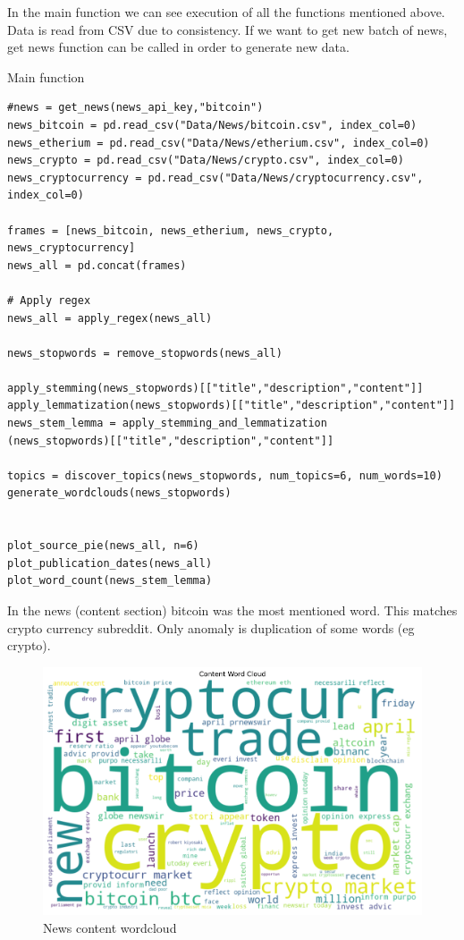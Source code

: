 In the main function we can see execution of all the functions mentioned above. Data is read from CSV due to consistency. If we want to get new batch of news, get news function can be called in order to generate new data.
\begin{listing}[H]
\caption{Main function}
\begin{verbatim}
#news = get_news(news_api_key,"bitcoin")
news_bitcoin = pd.read_csv("Data/News/bitcoin.csv", index_col=0)
news_etherium = pd.read_csv("Data/News/etherium.csv", index_col=0)
news_crypto = pd.read_csv("Data/News/crypto.csv", index_col=0)
news_cryptocurrency = pd.read_csv("Data/News/cryptocurrency.csv", index_col=0)

frames = [news_bitcoin, news_etherium, news_crypto, news_cryptocurrency]
news_all = pd.concat(frames)

# Apply regex
news_all = apply_regex(news_all)

news_stopwords = remove_stopwords(news_all)

apply_stemming(news_stopwords)[["title","description","content"]]
apply_lemmatization(news_stopwords)[["title","description","content"]]
news_stem_lemma = apply_stemming_and_lemmatization
(news_stopwords)[["title","description","content"]]

topics = discover_topics(news_stopwords, num_topics=6, num_words=10)
generate_wordclouds(news_stopwords)


plot_source_pie(news_all, n=6)
plot_publication_dates(news_all)
plot_word_count(news_stem_lemma)
\end{verbatim}
\end{listing}


In the news (content section) bitcoin was the most mentioned word. This matches crypto currency subreddit. Only anomaly is duplication of some words (eg crypto). 
\begin{figure}[H]
\includegraphics[scale=0.60]{img/B2/content_wordcloud.png}
\centering
\caption{News content wordcloud}
\label{fig:content_wordcloud}
\end{figure}

